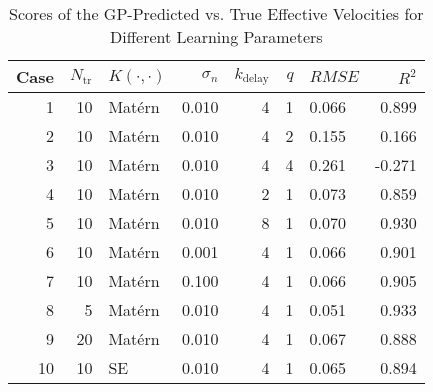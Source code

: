 \begin{table}[!ht]
\centering
\caption{Scores of the \ac{GP}-Predicted vs. True Effective Velocities for Different Learning Parameters}
\label{tab:scores}
\begin{tabular}{rrlrrrlr}
\toprule
 Case &  $N_\text{tr}$ & $K(\cdot, \cdot)$ &  $\sigma_n$ &  $k_\text{delay}$ &  $q$ &                  $RMSE$ &  $R^2$ \\
\midrule
    1 &             10 &          Mat\'ern &       0.010 &                 4 &    1 &  \cellcolor{Gray8}0.066 &  0.899 \\
    2 &             10 &          Mat\'ern &       0.010 &                 4 &    2 &  \cellcolor{Gray2}0.155 &  0.166 \\
    3 &             10 &          Mat\'ern &       0.010 &                 4 &    4 &  \cellcolor{Gray1}0.261 & -0.271 \\
    4 &             10 &          Mat\'ern &       0.010 &                 2 &    1 &  \cellcolor{Gray3}0.073 &  0.859 \\
    5 &             10 &          Mat\'ern &       0.010 &                 8 &    1 &  \cellcolor{Gray4}0.070 &  0.930 \\
    6 &             10 &          Mat\'ern &       0.001 &                 4 &    1 &  \cellcolor{Gray6}0.066 &  0.901 \\
    7 &             10 &          Mat\'ern &       0.100 &                 4 &    1 &  \cellcolor{Gray7}0.066 &  0.905 \\
    8 &              5 &          Mat\'ern &       0.010 &                 4 &    1 & \cellcolor{Gray10}0.051 &  0.933 \\
    9 &             20 &          Mat\'ern &       0.010 &                 4 &    1 &  \cellcolor{Gray5}0.067 &  0.888 \\
   10 &             10 &                SE &       0.010 &                 4 &    1 &  \cellcolor{Gray9}0.065 &  0.894 \\
\bottomrule
\end{tabular}
\end{table}
